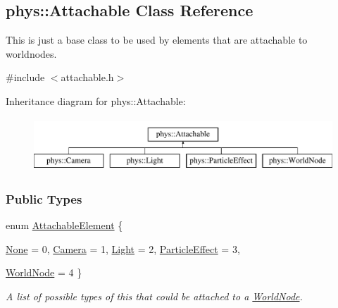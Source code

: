 \hypertarget{classphys_1_1Attachable}{
\subsection{phys::Attachable Class Reference}
\label{classphys_1_1Attachable}
}


This is just a base class to be used by elements that are attachable to worldnodes.  




{\ttfamily \#include $<$attachable.h$>$}

Inheritance diagram for phys::Attachable:\begin{figure}[H]
\begin{center}
\leavevmode
\includegraphics[height=2.000000cm]{classphys_1_1Attachable}
\end{center}
\end{figure}
\subsubsection*{Public Types}
\begin{DoxyCompactItemize}
\item 
enum \hyperlink{classphys_1_1Attachable_acd1fca033e7cc0bb3024a92d466d213a}{AttachableElement} \{ \par
\hyperlink{classphys_1_1Attachable_acd1fca033e7cc0bb3024a92d466d213aaca28a2a7b104d463288ef09731c26288}{None} =  0, 
\hyperlink{classphys_1_1Attachable_acd1fca033e7cc0bb3024a92d466d213aa8de5bba9ffca8ba85776e5a54eb26654}{Camera} =  1, 
\hyperlink{classphys_1_1Attachable_acd1fca033e7cc0bb3024a92d466d213aa33e8ea44892e656e8b94e744957c3aff}{Light} =  2, 
\hyperlink{classphys_1_1Attachable_acd1fca033e7cc0bb3024a92d466d213aa5bec8218f7c22f3cf4e54dbcef257657}{ParticleEffect} =  3, 
\par
\hyperlink{classphys_1_1Attachable_acd1fca033e7cc0bb3024a92d466d213aaff68a3a8303cf1b4fefc869c4d3a5367}{WorldNode} =  4
 \}
\begin{DoxyCompactList}\small\item\em A list of possible types of this that could be attached to a \hyperlink{classphys_1_1WorldNode}{WorldNode}. \item\end{DoxyCompactList}\end{DoxyCompactItemize}
